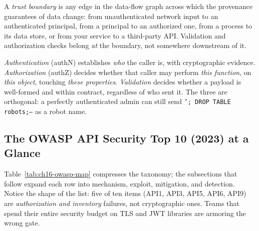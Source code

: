 \begin{definition}
A \emph{trust boundary} is any edge in the data-flow graph across which the
provenance guarantees of data change: from unauthenticated network input to
an authenticated principal, from a principal to an authorized one, from a
process to its data store, or from your service to a third-party API.
Validation and authorization checks belong \emph{at} the boundary, not
somewhere downstream of it.
\end{definition}

\begin{definition}
\emph{Authentication} (authN) establishes \emph{who} the caller is, with
cryptographic evidence. \emph{Authorization} (authZ) decides whether that
caller may perform \emph{this function}, on \emph{this object}, touching
\emph{these properties}. \emph{Validation} decides whether a payload is
well-formed and within contract, regardless of who sent it. The three are
orthogonal: a perfectly authenticated admin can still send
\texttt{'; DROP TABLE robots;--} as a robot name.
\end{definition}

\subsection{The OWASP API Security Top 10 (2023) at a Glance}
\label{sec:ch16-owasp-overview}

Table~\ref{tab:ch16-owasp-map} compresses the taxonomy; the subsections that
follow expand each row into mechanism, exploit, mitigation, and detection.
Notice the shape of the list: five of ten items (API1, API3, API5, API6,
API9) are \emph{authorization and inventory} failures, not cryptographic
ones. Teams that spend their entire security budget on TLS and JWT
libraries are armoring the wrong gate.

